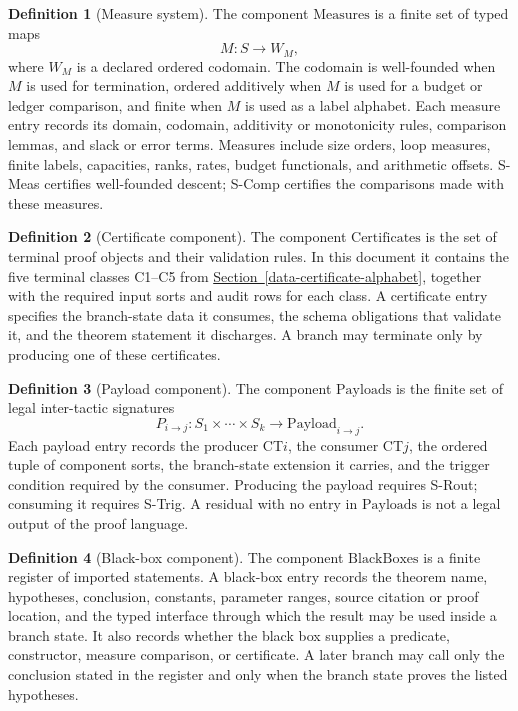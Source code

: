 \documentclass[
  11pt,
]{article}
\theoremstyle{definition}
\newtheorem{definition}{Definition}[section]
\newcommand{\secref}[1]{\hyperref[#1]{Section~\ref*{#1}}}
\begin{document}
\begin{definition}[Measure system]\label{def:proof-language-measures}
The component \(\mathrm{Measures}\) is a finite set of typed maps
\[
M:S\longrightarrow W_M,
\]
where \(W_M\) is a declared ordered codomain.  The codomain is
well-founded when \(M\) is used for termination, ordered additively when
\(M\) is used for a budget or ledger comparison, and finite when \(M\)
is used as a label alphabet.  Each measure entry records its domain,
codomain, additivity or monotonicity rules, comparison lemmas, and slack
or error terms.  Measures include size orders, loop measures, finite
labels, capacities, ranks, rates, budget functionals, and arithmetic
offsets.  S-Meas certifies well-founded descent; S-Comp certifies the
comparisons made with these measures.
\end{definition}

\begin{definition}[Certificate component]\label{def:proof-language-certificates}
The component \(\mathrm{Certificates}\) is the set of terminal proof
objects and their validation rules.  In this document it contains the
five terminal classes C1--C5 from \secref{data-certificate-alphabet},
together with the required input sorts and audit rows for each class.
A certificate entry specifies the branch-state data it consumes, the
schema obligations that validate it, and the theorem statement it
discharges.  A branch may terminate only by producing one of these
certificates.
\end{definition}

\begin{definition}[Payload component]\label{def:proof-language-payloads}
The component \(\mathrm{Payloads}\) is the finite set of legal
inter-tactic signatures
\[
P_{i\to j}:S_1\times\cdots\times S_k\longrightarrow
\mathrm{Payload}_{i\to j}.
\]
Each payload entry records the producer CT\(i\), the consumer CT\(j\),
the ordered tuple of component sorts, the branch-state extension it
carries, and the trigger condition required by the consumer.  Producing
the payload requires S-Rout; consuming it requires S-Trig.  A residual
with no entry in \(\mathrm{Payloads}\) is not a legal output of the
proof language.
\end{definition}

\begin{definition}[Black-box component]\label{def:proof-language-blackboxes}
The component \(\mathrm{BlackBoxes}\) is a finite register of imported
statements.  A black-box entry records the theorem name, hypotheses,
conclusion, constants, parameter ranges, source citation or proof
location, and the typed interface through which the result may be used
inside a branch state.  It also records whether the black box supplies a
predicate, constructor, measure comparison, or certificate.  A later
branch may call only the conclusion stated in the register and only when
the branch state proves the listed hypotheses.
\end{definition}
\end{document}
